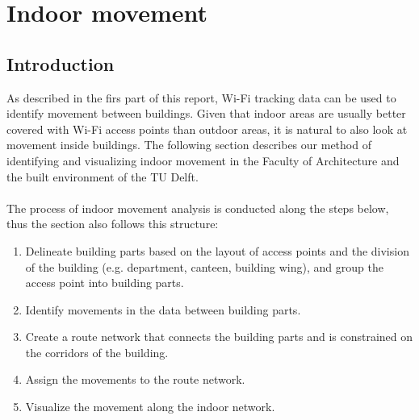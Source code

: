 \chapter{Indoor movement}\label{indoormovement}
\section{Introduction}
As described in the firs part of this report, Wi-Fi tracking data can be used to identify movement between buildings. Given that indoor areas are usually better
covered with Wi-Fi access points than outdoor areas, it is natural to also look at movement inside buildings. The following section describes our method of
identifying and visualizing indoor movement in the Faculty of Architecture and the built environment of the TU Delft.\\\\
The process of indoor movement analysis is conducted along the steps below, thus the section also follows this structure:

\begin{enumerate}
    \item Delineate building parts based on the layout of access points and the division of the building (e.g. department, canteen, building wing), and
group the access point into building parts.
    \item Identify movements in the data between building parts.
    \item Create a route network that connects the building parts and is constrained on the corridors of the building.
    \item Assign the movements to the route network.
    \item Visualize the movement along the indoor network.
\end{enumerate}

